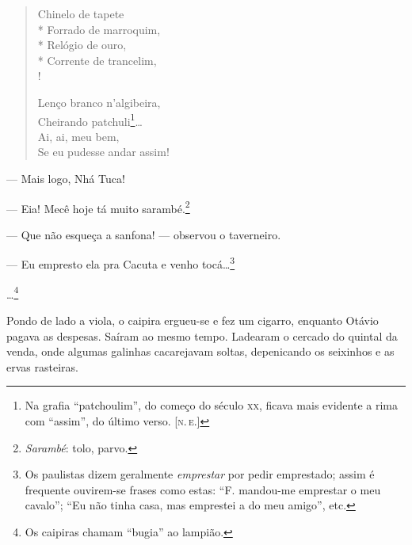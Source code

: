 {

\begin{verse}
\footnotesize
Chinelo de tapete \\*
Forrado de marroquim,\\*
Relógio de ouro,\\*
Corrente de trancelim,\\!

Lenço branco n'algibeira,\\
Cheirando patchuli\footnote{Na grafia ``patchoulim'', do começo 
do século \textsc{xx}, ficava mais evidente a rima com ``assim'', 
do último verso. [\textsc{n.\,e}.]}\ldots{}\\
Ai, ai, meu bem,\\
Se eu pudesse andar assim!
\end{verse}



--- Mais logo, Nhá Tuca!

--- Eia! Mecê hoje tá muito sarambé.\footnote{\emph{Sarambé}:
  tolo, parvo.}


--- Que não esqueça a sanfona! --- observou o taverneiro.

--- Eu empresto ela pra Cacuta e venho
tocá\ldots{}\footnote{Os paulistas dizem geralmente \emph{emprestar}
  por pedir emprestado; assim é frequente ouvirem-se frases como estas:
  ``F. mandou-me emprestar o meu cavalo''; ``Eu não tinha casa, mas
  emprestei a do meu amigo'', etc.}

\ldots{}\footnote{Os
  caipiras chamam ``bugia'' ao lampião.} 

Pondo de lado a viola, o caipira ergueu-se e fez um cigarro,
enquanto Otávio pagava as despesas. Saíram ao mesmo
tempo. Ladearam o cercado do quintal da venda, onde algumas galinhas
cacarejavam soltas, depenicando os seixinhos e as ervas
rasteiras.


}
